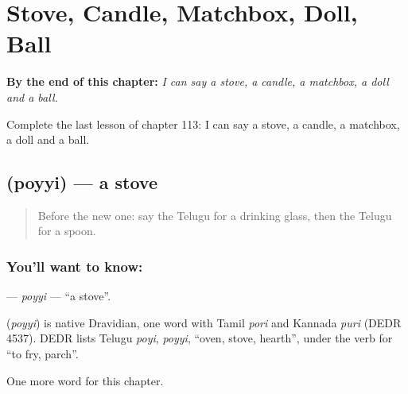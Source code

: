 
\chapter{Stove, Candle, Matchbox, Doll, Ball}
\label{ch:te-stove-candle-matchbox-doll-ball}

\begin{chapteropening}
\textbf{By the end of this chapter:} \emph{I can say a stove, a candle, a matchbox, a doll and a ball.}

Complete the last lesson of chapter 113: I can say a stove, a candle, a matchbox, a doll and a ball.
\end{chapteropening}

\section[\texorpdfstring{\te{పొయ్యి} (poyyi)}{పొయ్యి (poyyi)}]{ (poyyi) — a stove}

\label{lesson:TE-C113-poyyi}



\begin{quote}
Before the new one: say the Telugu for a drinking glass, then the Telugu for a spoon.
\end{quote}

\subsection*{You'll want to know: }
\textbf{} — \emph{poyyi} — \textquotedblleft{}a stove\textquotedblright{}.

\begin{cousinweb}
\textbf{} (\emph{poyyi}) is native Dravidian, one word with Tamil \emph{pori} and Kannada \emph{puri} (DEDR 4537). DEDR lists Telugu \emph{poyi}, \emph{poyyi}, \textquotedblleft{}oven, stove, hearth\textquotedblright{}, under the verb for \textquotedblleft{}to fry, parch\textquotedblright{}.
\end{cousinweb}

\begin{grammarlens}[title={What you've built}]
One more word for this chapter.
\end{grammarlens}

